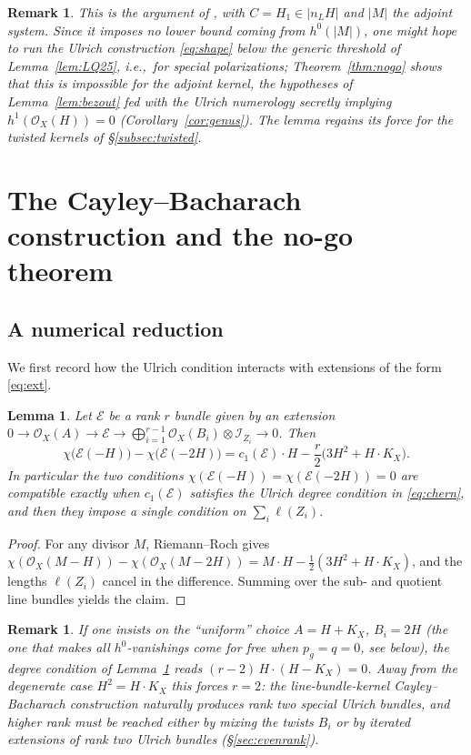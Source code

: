 \documentclass[10pt,a4paper]{amsart}
\newtheorem{lemma}[theorem]{Lemma}
\newtheorem{remark}[theorem]{Remark}
\newcommand{\OO}{\mathcal{O}}
\newcommand{\EE}{\mathcal{E}}
\newcommand{\II}{\mathcal{I}}
\newcommand{\len}{\ell}
\begin{document}
\begin{remark}\label{rem:anghel-role}
This is the argument of \cite[Th\'eor\`eme~2.2]{An94}, with $C=H_1\in|n_LH|$ and $|M|$ the adjoint system. Since it imposes no lower bound coming from $h^0(|M|)$, one might hope to run the Ulrich construction \eqref{eq:shape} below the generic threshold of Lemma~\ref{lem:LQ25}, i.e.,\ for \emph{special} polarizations; Theorem~\ref{thm:nogo} shows that this is impossible for the adjoint kernel, the hypotheses of Lemma~\ref{lem:bezout} fed with the Ulrich numerology secretly implying $h^1(\OO_X(H))=0$ (Corollary~\ref{cor:genus}). The lemma regains its force for the twisted kernels of \S\ref{subsec:twisted}.
\end{remark}

\section{The Cayley--Bacharach construction and the no-go theorem}\label{sec:ulrich}

\subsection{A numerical reduction}
We first record how the Ulrich condition interacts with extensions of the form \eqref{eq:ext}.

\begin{lemma}\label{lem:consistency}
Let $\EE$ be a rank $r$ bundle given by an extension
$0\to\OO_X(A)\to\EE\to\bigoplus_{i=1}^{r-1}\OO_X(B_i)\otimes\II_{Z_i}\to 0$. Then
\[
\chi\bigl(\EE(-H)\bigr)-\chi\bigl(\EE(-2H)\bigr)
= c_1(\EE)\cdot H-\frac{r}{2}\bigl(3H^2+H\cdot K_X\bigr).
\]
In particular the two conditions $\chi(\EE(-H))=\chi(\EE(-2H))=0$ are compatible exactly when $c_1(\EE)$ satisfies the Ulrich degree condition in \eqref{eq:chern}, and then they impose a single condition on $\sum_i\len(Z_i)$.
\end{lemma}

\begin{proof}
For any divisor $M$, Riemann--Roch gives
$\chi(\OO_X(M-H))-\chi(\OO_X(M-2H))=M\cdot H-\tfrac12(3H^2+H\cdot K_X)$,
and the lengths $\len(Z_i)$ cancel in the difference. Summing over the sub- and quotient line bundles yields the claim.
\end{proof}

\begin{remark}\label{rem:rank2forced}
If one insists on the ``uniform'' choice $A=H+K_X$, $B_i=2H$ (the one that makes all $h^0$-vanishings come for free when $p_g=q=0$, see below), the degree condition of Lemma~\ref{lem:consistency} reads $(r-2)\,H\cdot(H-K_X)=0$. Away from the degenerate case $H^2=H\cdot K_X$ this \emph{forces $r=2$}: the line-bundle-kernel Cayley--Bacharach construction naturally produces rank two special Ulrich bundles, and higher rank must be reached either by mixing the twists $B_i$ or by iterated extensions of rank two Ulrich bundles (\S\ref{sec:evenrank}).
\end{remark}
\end{document}
